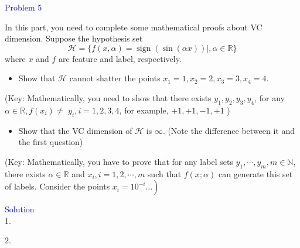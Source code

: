\textcolor{blue}{Problem 5}

In this part, you need to complete some mathematical proofs about VC dimension. Suppose the hypothesis set
$$
\mathcal{H}=\{f(x, \alpha)=\operatorname{sign}(\sin (\alpha x)) \mid, \alpha \in \mathbb{R}\}
$$
where $x$ and $f$ are feature and label, respectively.
\begin{itemize}
    \item Show that $\mathcal{H}$ cannot shatter the points $x_1=1, x_2=2, x_3=3, x_4=4$.
\end{itemize}
(Key: Mathematically, you need to show that there exists $y_1, y_2, y_3, y_4$, for any $\alpha \in \mathbb{R}, f\left(x_i\right) \neq$ $y_i, i=1,2,3,4$, for example, $+1,+1,-1,+1$ )
\begin{itemize}
\item Show that the VC dimension of $\mathcal{H}$ is $\infty$. (Note the difference between it and the first question)
\end{itemize}
(Key: Mathematically, you have to prove that for any label sets $y_1, \cdots, y_m, m \in \mathbb{N}$, there exists $\alpha \in \mathbb{R}$ and $x_i, i=1,2, \cdots, m$ such that $f(x ; \alpha)$ can generate this set of labels. Consider the points $\left.x_i=10^{-i} \ldots\right)$

\textcolor{blue}{Solution}\\
1. 











2.






